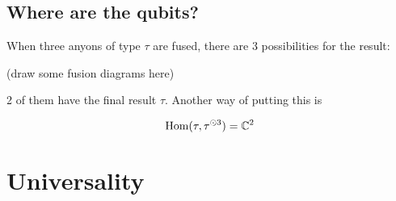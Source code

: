 \subsection{Where are the qubits?}

When three anyons of type $\tau$ are fused, there are 3 possibilities for the result: 

\begin{center}
    (draw some fusion diagrams here)
\end{center}

2 of them have the final result $\tau$. Another way of putting this is 

\begin{equation}
    \operatorname{Hom}(\tau, \tau^{\odot 3}) = \mathbb{C}^2
\end{equation}



\section{Universality}
